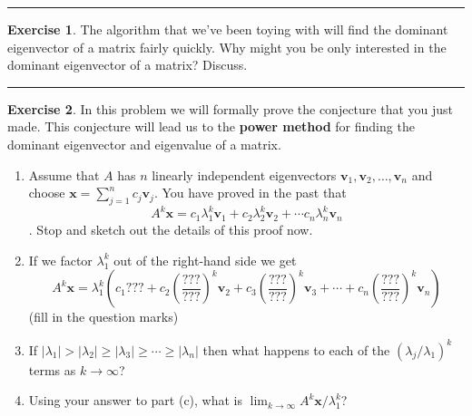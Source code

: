 \documentclass[
]{book}
\theoremstyle{definition}
\theoremstyle{definition}
\theoremstyle{definition}
\newtheorem{exercise}{Exercise}[chapter]
\theoremstyle{remark}
\begin{document}
\begin{center}\rule{0.5\linewidth}{0.5pt}\end{center}

\begin{exercise}
\protect\hypertarget{exr:unnamed-chunk-366}{}{\label{exr:unnamed-chunk-366} }The algorithm that we've been toying with will find the dominant eigenvector of a matrix fairly quickly. Why might you be only interested in the dominant eigenvector of a matrix? Discuss.
\end{exercise}

\begin{center}\rule{0.5\linewidth}{0.5pt}\end{center}

\begin{exercise}
\protect\hypertarget{exr:power-proof}{}{\label{exr:power-proof} }In this problem we will formally prove the conjecture that you just made. This conjecture will lead us to the \textbf{power method} for finding the dominant eigenvector and eigenvalue of a matrix.

\begin{enumerate}
\def\labelenumi{\alph{enumi}.}
\item
  Assume that \(A\) has \(n\) linearly independent eigenvectors
  \(\boldsymbol{v}_1, \boldsymbol{v}_2, \dots, \boldsymbol{v}_n\) and choose \(\boldsymbol{x} = \sum_{j=1}^n c_j \boldsymbol{v}_j\). You have proved in the past that
  \[A^k \boldsymbol{x} = c_1 \lambda_1^k \boldsymbol{v}_1 + c_2 \lambda_2^k \boldsymbol{v}_2 + \cdots c_n \lambda_n^k \boldsymbol{v}_n\].
  Stop and sketch out the details of this proof now.
\item
  If we factor \(\lambda_1^k\) out of the right-hand side we get
  \[A^k \boldsymbol{x} = \lambda_1^k \left( c_1 ??? + c_2 \left(
                  \frac{???}{???} \right)^k \boldsymbol{v}_2 + c_3 \left(
                  \frac{???}{???}
                  \right)^k \boldsymbol{v}_3 + \cdots + c_n \left( \frac{???}{???}
                  \right)^k \boldsymbol{v}_n \right)\]
  (fill in the question marks)
\item
  If \(|\lambda_1| > |\lambda_2| \ge |\lambda_3| \ge \cdots \ge |\lambda_n|\)
  then what happens to each of the \((\lambda_j/\lambda_1)^k\) terms as
  \(k \to \infty\)?
\item
  Using your answer to part (c), what is
  \(\lim_{k \to \infty} A^k \boldsymbol{x} / \lambda_1^k\)?
\end{enumerate}
\end{exercise}
\end{document}
